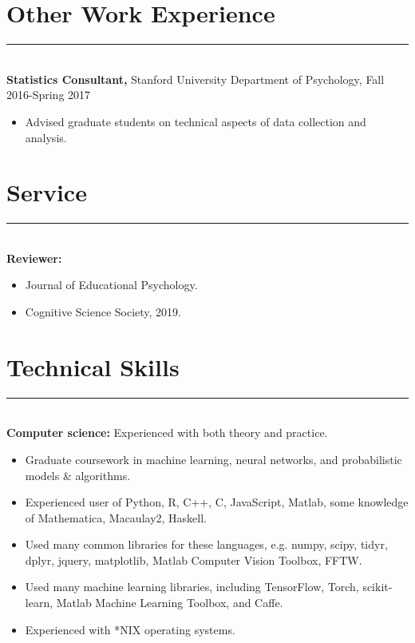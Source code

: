 \documentclass[margin]{res}
\begin{document}
\begin{resume}
\vspace{1pt}\section{Other Work Experience} \vspace{-15pt} \rule{\textwidth}{0.5pt} \\[3pt]
{\bf Statistics Consultant,} Stanford University Department of Psychology, Fall 2016-Spring 2017
\begin{itemize} \itemsep -2pt
 \item Advised graduate students on technical aspects of data collection and analysis. \end{itemize}
\vspace{1pt}\section{Service} \vspace{-15pt} \rule{\textwidth}{0.5pt} \\[3pt]
{\bf Reviewer:} 
\begin{itemize} \itemsep -2pt
 \item Journal of Educational Psychology.
 \item Cognitive Science Society, 2019.\end{itemize}
\vspace{1pt}\section{Technical Skills} \vspace{-15pt} \rule{\textwidth}{0.5pt} \\[3pt]
{\bf Computer science:} Experienced with both theory and practice. 
\begin{itemize} \itemsep -2pt
  \item Graduate coursework in machine learning, neural networks, and probabilistic models \& algorithms.
  \item Experienced user of Python, R, C++, C, JavaScript, Matlab, some knowledge of Mathematica, Macaulay2, Haskell. 
  \item Used many common libraries for these languages, e.g. numpy, scipy, tidyr, dplyr, jquery, matplotlib, Matlab Computer Vision Toolbox, FFTW.
  \item Used many machine learning libraries, including TensorFlow, Torch, scikit-learn, Matlab Machine Learning Toolbox, and Caffe.
  \item Experienced with *NIX operating systems.

\end{itemize}
\end{resume}
\end{document}
